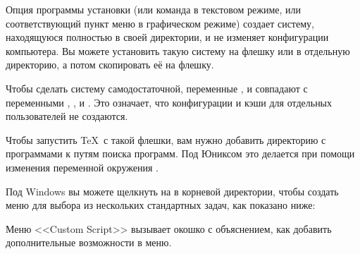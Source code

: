 \documentclass{article}
\begin{document}
Опция программы установки  (или команда  в
текстовом режиме, или соответствующий пункт меню в графическом режиме)
создает систему,
находящуюся полностью в своей директории, и не изменяет конфигурации
компьютера.  Вы можете установить такую систему на \USB{} флешку или в
отдельную директорию, а потом скопировать её на флешку.

Чтобы сделать систему самодостаточной, переменные ,
 и  совпадают с переменными
, , и
.   Это означает, что конфигурации и кэши для
отдельных пользователей не создаются.

Чтобы запустить \TeX\ с такой флешки, вам нужно добавить директорию с
программами к путям поиска программ.  Под Юниксом это делается при
помощи изменения переменной окружения .  

Под Windows вы можете щелкнуть на  в корневой
директории, чтобы создать меню для выбора из нескольких стандартных
задач, как показано ниже:

\medskip
{}
\smallskip

\noindent  Меню <<Custom Script>> вызывает окошко
с объяснением, как добавить дополнительные возможности в меню.  



\end{document}
